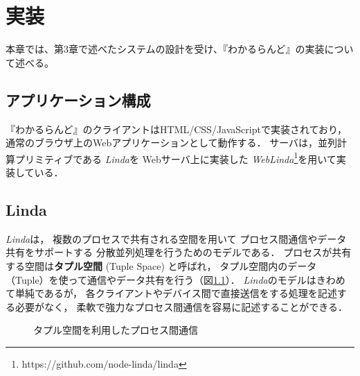 \chapter{実装}
\label{chap:implementation}

本章では、第3章で述べたシステムの設計を受け、『わかるらんど』の実装について述べる。

\newpage

\section{アプリケーション構成}

『わかるらんど』のクライアントはHTML/CSS/JavaScriptで実装されており，
通常のブラウザ上のWebアプリケーションとして動作する．
サーバは，並列計算プリミティブである
\textit{Linda}\cite{Carriero:1989:LC:63334.63337}を
Webサーバ上に実装した
\textit{WebLinda}\cite{shokai_furnitue}\footnote{https://github.com/node-linda/linda}を用いて実装している．

\section{Linda}

\textit{Linda}は，
複数のプロセスで共有される空間を用いて
プロセス間通信やデータ共有をサポートする
分散並列処理を行うためのモデルである\cite{masui_linda}．
プロセスが共有する空間は\textbf{タプル空間} (Tuple Space) と呼ばれ，
タプル空間内のデータ （Tuple）を使って通信やデータ共有を行う（図\ref{linda}）．
\textit{Linda}のモデルはきわめて単純であるが，
各クライアントやデバイス間で直接送信をする処理を記述する必要がなく，
柔軟で強力なプロセス間通信を容易に記述することができる．

\begin{figure}[h]
\centering
{}
\caption{タプル空間を利用したプロセス間通信}
\label{linda}
\end{figure}

